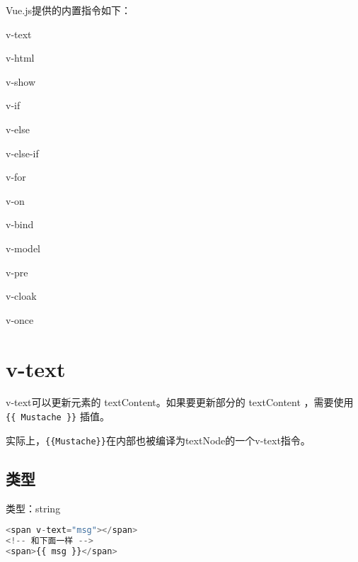 Vue.js提供的内置指令如下：

\begin{compactitem}
\item v-text
\item v-html
\item v-show
\item v-if
\item v-else
\item v-else-if
\item v-for
\item v-on
\item v-bind
\item v-model
\item v-pre
\item v-cloak
\item v-once
\end{compactitem}

\section{v-text}


v-text可以更新元素的 textContent。如果要更新部分的 textContent ，需要使用 \texttt{\{\{ Mustache \}\}} 插值。

实际上，\texttt{\{\{Mustache\}\}}在内部也被编译为textNode的一个v-text指令。

\subsection{类型}

\begin{compactitem}
\item 类型：string
\end{compactitem}


\begin{lstlisting}[language=JavaScript]
<span v-text="msg"></span>
<!-- 和下面一样 -->
<span>{{ msg }}</span>
\end{lstlisting}



\begin{lstlisting}[language=JavaScript]

\end{lstlisting}




\begin{lstlisting}[language=JavaScript]

\end{lstlisting}




